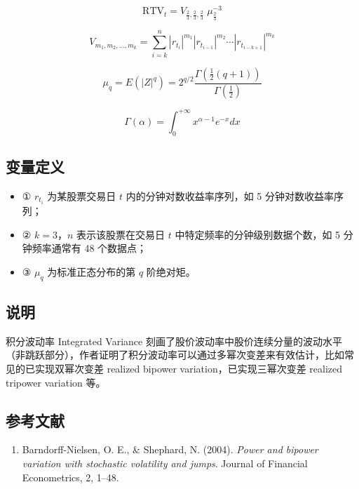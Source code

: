 \documentclass{article}
\begin{document}
\begin{equation}
    \mathrm{RTV}_t = V_{\frac{2}{3}, \frac{2}{3}, \frac{2}{3}} \; \mu_{\frac{2}{3}}^{-3}
\end{equation}

\begin{equation}
    V_{m_1, m_2, \dots, m_k} = \sum_{i=k}^{n} |r_{t_i}|^{m_1} |r_{t_{i-1}}|^{m_2} \cdots |r_{t_{i-k+1}}|^{m_k}
\end{equation}

\begin{equation}
    \mu_q = E(|Z|^q) = 2^{q/2} \frac{\Gamma\left(\frac{1}{2}(q+1)\right)}{\Gamma\left(\frac{1}{2}\right)}
\end{equation}

\begin{equation}
    \Gamma(\alpha) = \int_0^{+\infty} x^{\alpha-1} e^{-x} dx
\end{equation}

\subsection{变量定义}
\begin{itemize}
    \item ① \( r_{t_i} \) 为某股票交易日 \( t \) 内的分钟对数收益率序列，如 5 分钟对数收益率序列；
    \item ② \( k=3 \)，\( n \) 表示该股票在交易日 \( t \) 中特定频率的分钟级别数据个数，如 5 分钟频率通常有 48 个数据点；
    \item ③ \( \mu_q \) 为标准正态分布的第 \( q \) 阶绝对矩。
\end{itemize}

\subsection{说明}
积分波动率 Integrated Variance 刻画了股价波动率中股价连续分量的波动水平（非跳跃部分），作者证明了积分波动率可以通过多幂次变差来有效估计，比如常见的已实现双幂次变差 realized bipower variation，已实现三幂次变差 realized tripower variation 等。

\subsection{参考文献}
\begin{enumerate}
    \item Barndorff-Nielsen, O. E., \& Shephard, N. (2004). \textit{Power and bipower variation with stochastic volatility and jumps}. Journal of Financial Econometrics, 2, 1–48.
\end{enumerate}
\end{document}
